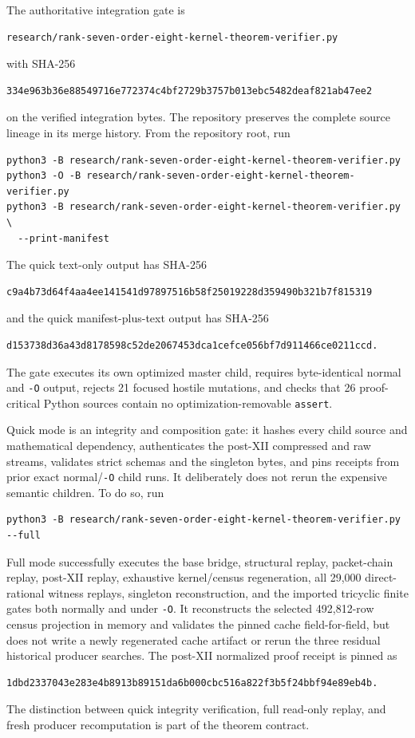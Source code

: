 \documentclass[11pt]{article}
\theoremstyle{remark}
\begin{document}
The authoritative integration gate is
\begin{verbatim}
research/rank-seven-order-eight-kernel-theorem-verifier.py
\end{verbatim}
with SHA-256
\begin{verbatim}
334e963b36e88549716e772374c4bf2729b3757b013ebc5482deaf821ab47ee2
\end{verbatim}
on the verified integration bytes.  The repository preserves the complete
source lineage in its merge history.  From the repository root, run
\begin{verbatim}
python3 -B research/rank-seven-order-eight-kernel-theorem-verifier.py
python3 -O -B research/rank-seven-order-eight-kernel-theorem-verifier.py
python3 -B research/rank-seven-order-eight-kernel-theorem-verifier.py \
  --print-manifest
\end{verbatim}
The quick text-only output has SHA-256
\begin{verbatim}
c9a4b73d64f4aa4ee141541d97897516b58f25019228d359490b321b7f815319
\end{verbatim}
and the quick manifest-plus-text output has SHA-256
\begin{verbatim}
d153738d36a43d8178598c52de2067453dca1cefce056bf7d911466ce0211ccd.
\end{verbatim}
The gate executes its own optimized master child, requires byte-identical
normal and \texttt{-O} output, rejects 21 focused hostile mutations, and checks
that 26 proof-critical Python sources contain no optimization-removable
\texttt{assert}.

Quick mode is an integrity and composition gate: it hashes every child source
and mathematical dependency, authenticates the post-XII compressed and raw
streams, validates strict schemas and the singleton bytes, and pins receipts
from prior exact normal/\texttt{-O} child runs.  It deliberately does not
rerun the expensive semantic children.  To do so, run
\begin{verbatim}
python3 -B research/rank-seven-order-eight-kernel-theorem-verifier.py --full
\end{verbatim}
Full mode successfully executes the base bridge, structural replay,
packet-chain replay, post-XII replay, exhaustive kernel/census regeneration,
all 29,000 direct-rational witness replays, singleton reconstruction, and the
imported tricyclic finite gates both normally and under \texttt{-O}.  It
reconstructs the selected 492,812-row census projection in memory and validates
the pinned cache field-for-field, but does not write a newly regenerated cache
artifact or rerun the three residual historical producer searches.  The
post-XII normalized proof receipt is pinned as
\begin{verbatim}
1dbd2337043e283e4b8913b89151da6b000cbc516a822f3b5f24bbf94e89eb4b.
\end{verbatim}
The distinction between quick integrity verification, full read-only replay,
and fresh producer recomputation is part of the theorem contract.
\end{document}
